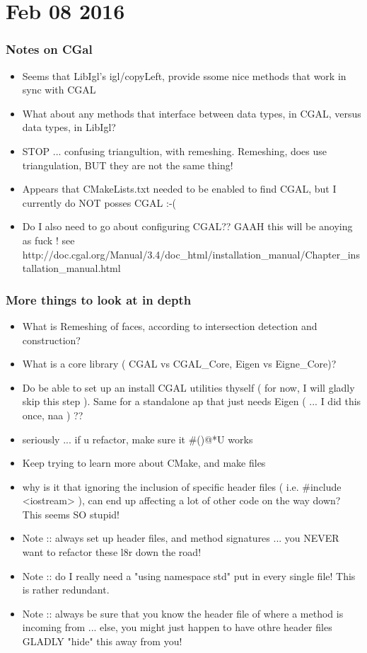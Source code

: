 \documentclass{article}
\begin{document}
\part{Feb 08 2016}
\section{Notes on CGal}
\begin{itemize}
	\item Seems that LibIgl's igl/copyLeft, provide ssome nice methods that work in sync with CGAL
	\item What about any methods that interface between data types, in CGAL, versus data types, in LibIgl? 
	\item STOP ... confusing triangultion, with remeshing. Remeshing, does use triangulation, BUT they are not the same thing! 
	\item Appears that CMakeLists.txt needed to be enabled to find CGAL, but I currently do NOT posses CGAL :-(
	\item Do I also need to go about configuring CGAL?? GAAH this will be anoying as fuck !
		see http://doc.cgal.org/Manual/3.4/doc_html/installation_manual/Chapter_installation_manual.html
\end{itemize}

\section{More things to look at in depth}
\begin{itemize}
	\item What is Remeshing of faces, according to intersection detection and construction?
	\item What is a core library ( CGAL vs CGAL_Core, Eigen vs Eigne_Core)?
	\item Do be able to set up an install CGAL utilities thyself ( for now, I will gladly skip this step ). Same for a standalone ap that just needs Eigen ( ... I did this once, naa ) ?? 
	\item seriously ... if u refactor, make sure it #()@*U works
	\item Keep trying to learn more about CMake, and make files
	\item why is it that ignoring the inclusion of specific header files ( i.e. #include <iostream> ), can end up affecting a lot of other code on the way down? This seems SO stupid!
	\item Note :: always set up header files, and method signatures ... you NEVER want to refactor these l8r down the road!
	\item Note :: do I really need a "using namespace std" put in every single file! This is rather redundant.
	\item Note :: always be sure that you know the header file of where a method is incoming from ... else, you might just happen to have othre header files GLADLY "hide" this away from you! 
\end{itemize}
\end{document}
